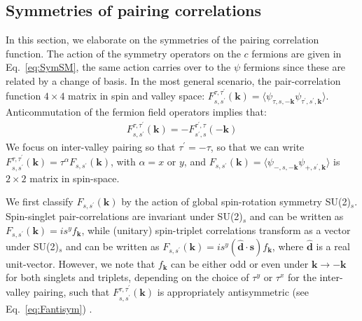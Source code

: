 \documentclass[aps,pra,twocolumn,superscriptaddress,10pt,article,nofootinbib,showpacs,longbibliography]{revtex4-1}
\def \d{{\mathbf d}}
\def \k{{\mathbf k}}
\def \s{{\mathbf s}}
\def \beq{\begin{eqnarray}}
\def \eeq{\end{eqnarray}}
\begin{document}
\subsection{Symmetries of pairing correlations}
In this section, we elaborate on the symmetries of the pairing correlation function.
The action of the symmetry operators on the $c$ fermions are given in Eq.~\eqref{eq:SymSM}, the same action carries over to the $\psi$ fermions since these are related by a change of basis.
In the most general scenario, the pair-correlation function $4 \times 4$ matrix in spin and valley space: $F^{\tau, \tau^\prime}_{s,s^\prime}(\k) = \langle \psi_{\tau,s,-\k} \psi_{\tau^\prime,s^\prime,\k} \rangle$.
Anticommutation of the fermion field operators implies that:
\beq
F^{\tau, \tau^\prime}_{s,s^\prime}(\k) = - F^{\tau^\prime,\tau}_{s^\prime,s}(-\k)
\label{eq:Fantisym}
\eeq
We focus on inter-valley pairing so that $\tau^\prime = -\tau$, so that  we can write $F^{\tau, \tau^\prime}_{s,s^\prime}(\k) = \tau^\alpha F_{s,s^\prime}(\k)$, with $\alpha = x$ or $y$, and $F_{s,s^\prime}(\k) = \langle \psi_{-,s,-\k} \psi_{+,s^\prime,\k} \rangle$ is $2 \times 2$ matrix in spin-space.

We first classify $F_{s,s^\prime}(\k)$ by the action of global spin-rotation symmetry SU(2)$_s$. 
Spin-singlet pair-correlations are invariant under  SU(2)$_s$ and can be written as $F_{s,s^\prime}(\k) =  i s^y f_\k$, while (unitary) spin-triplet correlations transform as a vector under SU(2)$_s$ and can be written as $F_{s,s^\prime}(\k) = i s^y (\hat{\d}\cdot \s) f_\k$, where $\hat{\d}$ is a real unit-vector. 
However, we note that $f_\k$ can be either odd or even under $\k \to -\k$ for both singlets and triplets, depending on the choice of $\tau^y$ or $\tau^x$ for the inter-valley pairing, such that $F^{\tau, \tau^\prime}_{s,s^\prime}(\k)$ is appropriately antisymmetric (see Eq.~\eqref{eq:Fantisym}) . 
\end{document}
